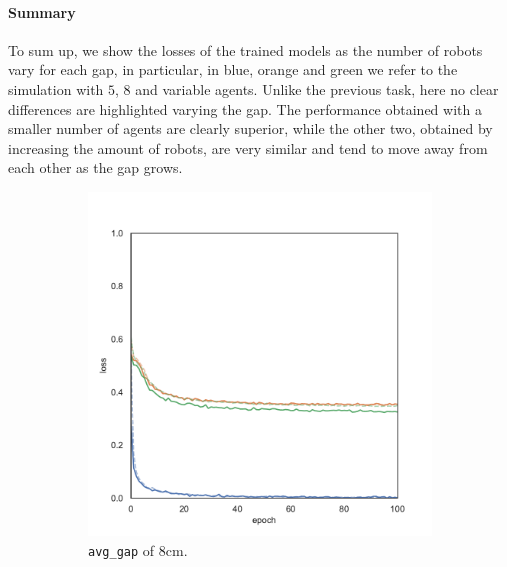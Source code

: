 \paragraph*{Summary}
To sum up, we show the losses of the trained models as the number of robots vary 
for each gap, in particular, in blue, orange and green we refer to the simulation 
with $5$, $8$ and variable agents. 
Unlike the previous task, here no clear differences are highlighted varying the 
gap. 
The performance obtained with a smaller number of agents are clearly superior, 
while the other two, obtained by increasing the amount of robots, are very similar 
and tend to move away from each other as the gap grows.
\begin{figure}[!htb]
	\begin{center}
		\begin{subfigure}[h]{0.32\textwidth}
			\includegraphics[width=\textwidth]{contents/images/task2/loss-communication-gap_8}%
			\caption{\texttt{avg\_gap} of $8$\gls{cm}.}
		\end{subfigure}
		\hfill
		\begin{subfigure}[h]{0.32\textwidth}

\end{subfigure}
\end{center}
\end{figure}
